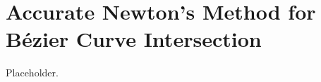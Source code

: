 \chapter{Accurate Newton's Method for B\'{e}zier Curve Intersection}
\label{chap:compensated-newton}

Placeholder.
